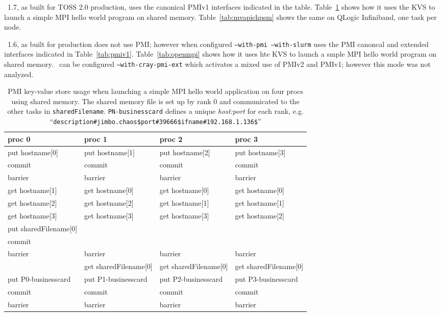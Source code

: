 \ 1.7, as built for TOSS 2.0 production, uses the canonical
PMIv1 interfaces indicated in the table.
Table~\ref{tab:mvapich} shows how it uses the KVS to launch a simple MPI
hello world program on shared memory.
Table~\ref{tab:mvapichpsm} shows the same on QLogic Infiniband, one task
per node.

\openmpi\ 1.6, as built for production does not use PMI;
however when configured {\tt --with-pmi --with-slurm} uses the 
PMI canoncal and extended interfaces indicated in Table~\ref{tab:pmiv1}.
Table~\ref{tab:openmpi} shows how it uses hte KVS to launch a smple MPI
hello world program on shared memory.
\openmpi\ can be configured {\tt --with-cray-pmi-ext} which
activates a mixed use of PMIv2 and PMIv1; however this mode was not analyzed.

\begin{table}
\centering
\begin{tabular}{|p{4cm}|p{4cm}|p{4cm}|p{4cm}|}\hline
\textbf{proc 0} &       \textbf{proc 1} &   \textbf{proc 2} &    \textbf{proc 3}\\
\hline
put hostname[0] &     put hostname[1] &     put hostname[2] &     put hostname[3]\\
commit &              commit &              commit  &             commit\\
barrier &             barrier &             barrier &             barrier\\
\hline
get hostname[1] &     get hostname[0] &     get hostname[0] &     get hostname[0]\\
get hostname[2] &     get hostname[2] &     get hostname[1] &     get hostname[1]\\
get hostname[3] &     get hostname[3] &     get hostname[3] &     get hostname[2]\\
put sharedFilename[0] & & & \\
commit  & & &\\
barrier& barrier & barrier & barrier\\
\hline
 &                     get sharedFilename[0]&get sharedFilename[0]&get sharedFilename[0]\\
put P0-businesscard & put P1-businesscard & put P2-businesscard & put P3-businesscard\\
commit &              commit &              commit &              commit\\
barrier &             barrier &             barrier &             barrier\\
\hline
\end{tabular}
\caption{ PMI key-value store usage when launching a simple 
MPI hello world application on four procs using shared memory.
The shared memory file
is set up by rank 0 and communicated to the other tasks in {\tt sharedFilename}.
{\tt PN-businesscard} defines a unique {\em host:port} for each rank, e.g.
``{\tt description\#jimbo.chaos\$port\#39666\$ifname\#192.168.1.136\$}''}
\label{tab:mvapich}
\end{table}

